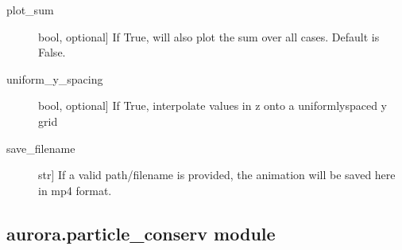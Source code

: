 \documentclass[letterpaper,10pt,english]{sphinxmanual}
\begin{document}
\begin{fulllineitems}
\begin{description}
\begin{description}
\item[{plot\_sum}] \leavevmode{[}bool, optional{]}
If True, will also plot the sum over all  cases. Default is False.

\item[{uniform\_y\_spacing}] \leavevmode{[}bool, optional{]}
If True, interpolate values in z onto a uniformly\sphinxhyphen{}spaced y grid

\item[{save\_filename}] \leavevmode{[}str{]}
If a valid path/filename is provided, the animation will be saved here in mp4 format.

\end{description}

\end{description}

\end{fulllineitems}



\subsection{aurora.particle\_conserv module}
\label{\detokenize{aurora:module-aurora.particle_conserv}}\label{\detokenize{aurora:aurora-particle-conserv-module}}
\end{document}
